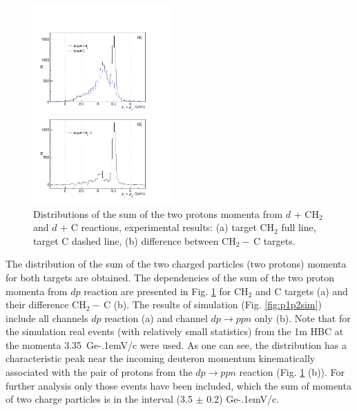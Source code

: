 \documentclass[twocolumn,epjc3]{svjour3}
\newcommand{\dpfrag} {\ensuremath{dp \rightarrow ppn}\xspace}
\newcommand{\GeVc}   {Ge\kern-.1emV/c\xspace}
\begin{document}
\begin{figure}[h]
  \centering
  \includegraphics[width=0.48\textwidth]{p1_plus_p2_1.pdf}
  \caption{Distributions of the sum of the two protons momenta from $d$ +
    CH$_{2}$ and $d$ + C reactions, experimental results: (a) target CH$_2$ full
    line, target C dashed line, (b) difference between CH$_2-$\,C targets.}
  \label{fig:p1p2exp}
\end{figure}

The distribution of the sum of the two charged particles (two protons) momenta
for both targets are obtained.
The dependencies of the sum of the two proton
momenta from $dp$ reaction are presented in Fig. \ref{fig:p1p2exp} for CH$_2$
and C targets (a) and their difference CH$_2-\,$C (b). The results of simulation
(Fig. \ref{fig:p1p2sim}) include all channels $dp$ reaction (a) and channel
\dpfrag only (b).
Note that for the simulation real events (with relatively small statistics) from
the 1m HBC at the momenta 3.35~\GeVc were used. As one can see, the distribution
has a characteristic peak near the incoming deuteron momentum kinematically
associated with the pair of protons from the \dpfrag reaction
(Fig. \ref{fig:p1p2exp} (b)). For further analysis only those events have been
included, which the sum of momenta of two charge particles is in the interval
(3.5 $\pm$ 0.2) \GeVc.


\end{document}
